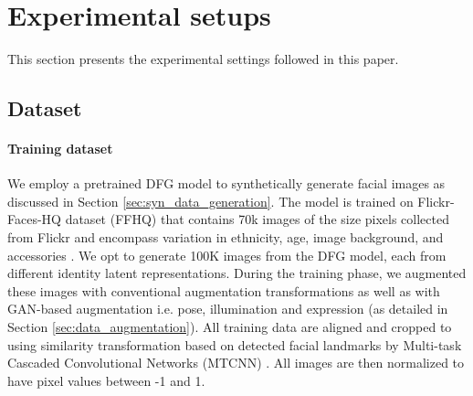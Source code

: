 \documentclass[10pt,twocolumn,letterpaper]{ieeeconf}
\begin{document}
\begin{table}[h!]
\caption{The effect of augmentation on identity in the images indicated by the verification performances as EER, FMR10, FMR100 and FMR1000 on three constructed datasets using GAN-based, RandAugment, and GAN-based with RandAugment augmentations. GAN-based with RandAugment augmentation results in bigger effects on identity, providing more challenging samples for the FR training.}
\label{tab:distribution_metrics}
\vspace{-4mm}
\end{table}

\section{Experimental setups}
This section presents the experimental settings followed in this paper.
\subsection{Dataset}
\vspace{-2mm}
\paragraph{Training dataset}
We employ a pretrained DFG model to synthetically generate facial images as discussed in Section \ref{sec:syn_data_generation}. The model is trained on Flickr-Faces-HQ dataset (FFHQ) \cite{StyleGAN} that contains 70k images of the size  pixels collected from Flickr and encompass variation in ethnicity, age, image background, and accessories \cite{StyleGAN}. We opt to generate 100K images from the DFG model, each from different identity latent representations. During the training phase, we augmented these images with conventional augmentation transformations as well as with GAN-based augmentation i.e. pose, illumination and expression (as detailed in Section \ref{sec:data_augmentation}). All training data are aligned and cropped to  using similarity transformation \cite{ArcFace,ElasticFace,CurricularFace} based on detected facial landmarks by Multi-task Cascaded Convolutional Networks (MTCNN) \cite{MTCNN}. All images are then normalized to have pixel values between -1 and 1.
\end{document}

